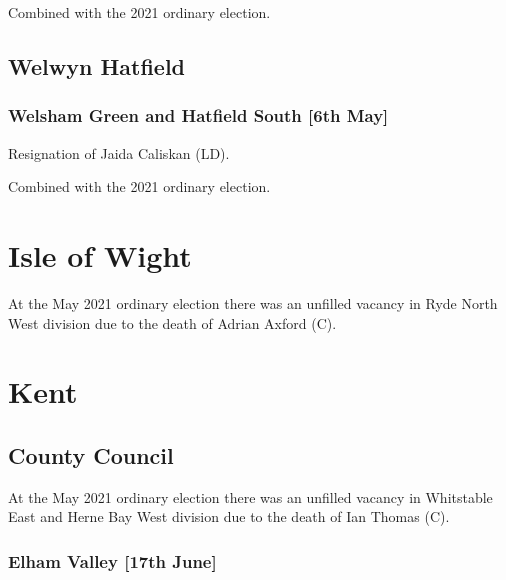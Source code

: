 \documentclass[a4paper,openany]{book}
\begin{document}
\begin{resultsiii}
Combined with the 2021 ordinary election.

\subsection*{Welwyn Hatfield}

\subsubsection*{Welsham Green and Hatfield South \hspace*{\fill}\nolinebreak[1]%
	\enspace\hspace*{\fill}
	[6th May]}


Resignation of Jaida Caliskan (LD).

Combined with the 2021 ordinary election.

\section{Isle of Wight}

At the May 2021 ordinary election there was an unfilled vacancy in Ryde North West division due to the death of Adrian Axford (C).

\section{Kent}

\subsection*{County Council}

At the May 2021 ordinary election there was an unfilled vacancy in Whitstable East and Herne Bay West division due to the death of Ian Thomas (C).

\subsubsection*{Elham Valley \hspace*{\fill}\nolinebreak[1]%
	\enspace\hspace*{\fill}
	[17th June]}


\end{resultsiii}
\end{document}
